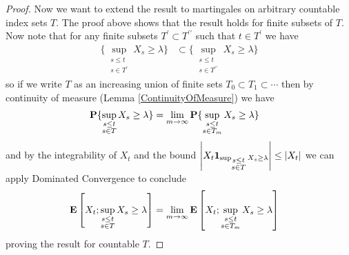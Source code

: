 \begin{proof}
Now we want to extend the result to martingales on arbitrary countable
index sets $T$.  The proof above shows that the result holds for
finite subsets of $T$.  Now note that for any finite subsets $T^\prime
\subset T^{\prime\prime}$ such that $t \in T^\prime$ we have 
\begin{align*}
\lbrace \sup_{\substack{s \leq t\\
s \in T^\prime}} X_s \geq \lambda  \rbrace &\subset
\lbrace \sup_{\substack{s \leq t\\
s \in T^{\prime\prime}}} X_s \geq \lambda  \rbrace
\end{align*}
so if we write $T$ as an increasing union of finite sets $T_0 \subset
T_1 \subset \cdots$ then by continuity of measure (Lemma
\ref{ContinuityOfMeasure}) we have 
\begin{align*}
\textbf{P}\{\sup_{\substack{s \leq t \\ s \in T}} X_s \geq \lambda\}
&= 
\lim_{m \to \infty} \textbf{P}\{\sup_{\substack{s \leq t \\
s \in T_m}}  X_s \geq \lambda\} 
\end{align*}
and by the integrability of $X_t$ and the bound $\left \vert X_t
  \textbf{1}_{\sup_{\substack{s \leq t \\ s \in T}} X_s  \geq
    \lambda} \right \vert \leq \left \vert X_t \right \vert$ we can apply Dominated Convergence to conclude
\begin{align*}
\textbf{E}\left[X_t ; \sup_{\substack{s \leq t \\ s \in T}} X_s  \geq \lambda\right] &= 
\lim_{m \to \infty} \textbf{E}\left[X_t ; \sup_{\substack{s \leq t \\ s
      \in T_m}} X_s  \geq \lambda\right]
\end{align*}
proving the result for countable $T$.
\end{proof}

